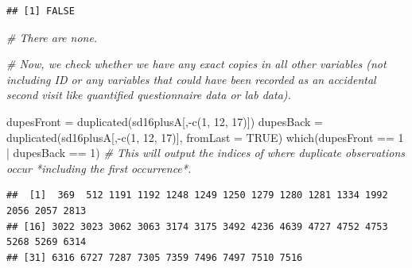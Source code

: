\documentclass[
  11pt,
]{article}
\newenvironment{Shaded}{\begin{snugshade}}{\end{snugshade}}
\newcommand{\AttributeTok}[1]{\textcolor[rgb]{0.77,0.63,0.00}{#1}}
\newcommand{\CommentTok}[1]{\textcolor[rgb]{0.56,0.35,0.01}{\textit{#1}}}
\newcommand{\ConstantTok}[1]{\textcolor[rgb]{0.00,0.00,0.00}{#1}}
\newcommand{\DecValTok}[1]{\textcolor[rgb]{0.00,0.00,0.81}{#1}}
\newcommand{\FunctionTok}[1]{\textcolor[rgb]{0.00,0.00,0.00}{#1}}
\newcommand{\NormalTok}[1]{#1}
\newcommand{\OtherTok}[1]{\textcolor[rgb]{0.56,0.35,0.01}{#1}}
\newcommand{\SpecialCharTok}[1]{\textcolor[rgb]{0.00,0.00,0.00}{#1}}
\begin{document}
\begin{Shaded}
\end{Shaded}

\begin{verbatim}
## [1] FALSE
\end{verbatim}

\begin{Shaded}
\begin{Highlighting}[]
\CommentTok{\# There are none.}

\CommentTok{\# Now, we check whether we have any exact copies in all other variables (not including ID or any variables that could have been recorded as an accidental second visit like quantified questionnaire data or lab data).}
 
\NormalTok{dupesFront }\OtherTok{=} \FunctionTok{duplicated}\NormalTok{(sd16plusA[,}\SpecialCharTok{{-}}\FunctionTok{c}\NormalTok{(}\DecValTok{1}\NormalTok{, }\DecValTok{12}\NormalTok{, }\DecValTok{17}\NormalTok{)])}
\NormalTok{dupesBack }\OtherTok{=}  \FunctionTok{duplicated}\NormalTok{(sd16plusA[,}\SpecialCharTok{{-}}\FunctionTok{c}\NormalTok{(}\DecValTok{1}\NormalTok{, }\DecValTok{12}\NormalTok{, }\DecValTok{17}\NormalTok{)], }\AttributeTok{fromLast =} \ConstantTok{TRUE}\NormalTok{)}
\FunctionTok{which}\NormalTok{(dupesFront }\SpecialCharTok{==} \DecValTok{1} \SpecialCharTok{|}\NormalTok{ dupesBack }\SpecialCharTok{==} \DecValTok{1}\NormalTok{) }\CommentTok{\# This will output the indices of where duplicate observations occur *including the first occurrence*.}
\end{Highlighting}
\end{Shaded}

\begin{verbatim}
##  [1]  369  512 1191 1192 1248 1249 1250 1279 1280 1281 1334 1992 2056 2057 2813
## [16] 3022 3023 3062 3063 3174 3175 3492 4236 4639 4727 4752 4753 5268 5269 6314
## [31] 6316 6727 7287 7305 7359 7496 7497 7510 7516
\end{verbatim}

\begin{Shaded}
\end{Shaded}
\end{document}
